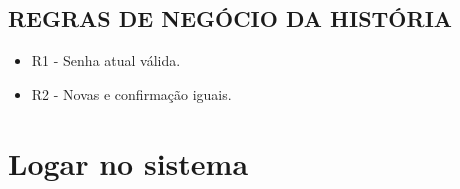 \subsection*{\textbf{REGRAS DE NEGÓCIO DA HISTÓRIA}}

\begin{itemize}
    \item[] R1 - Senha atual válida.
    \item[] R2 - Novas e confirmação iguais.
\end{itemize}




\section{Logar no sistema}%

